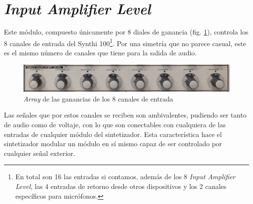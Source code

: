 \section[\textit{Input Amplifier Level}]{\textit{Input Amplifier Level}}

Este módulo, compuesto únicamente por 8 diales de ganancia (fig. \ref{fig:input_amplifier_level}), controla los 8 canales de entrada del Synthi 100\footnote{En total son 16 las entradas si contamos, además de los 8 \textit{Input Amplifier Level}, las 4 entradas de retorno desde otros dispositivos y los 2 canales específicos para micrófonos.}. Por una simetría que no parece casual, este es el mismo número de canales que tiene para la salida de audio. 

\begin{figure}
	\centering
	\includegraphics[width=1\textwidth]{images/input_amplifier_level}
	\caption[\textit{Input Amplifier Level}]{\textit{Array} de las ganancias de los 8 canales de entrada}
	\label{fig:input_amplifier_level}
\end{figure}

Las señales que por estos canales se reciben son ambivalentes, pudiendo ser tanto de audio como de voltaje, con lo que son conectables con cualquiera de las entradas de cualquier módulo del sintetizador. Esta característica hace el sintetizador modular un módulo en sí mismo capaz de ser controlado por cualquier señal exterior. 